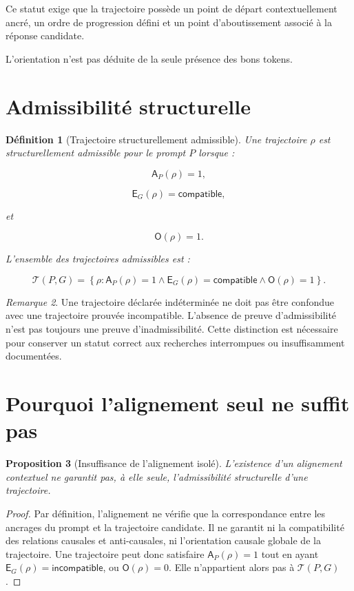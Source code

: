 \documentclass[11pt,a4paper,oneside]{book}
\newtheorem{definition}{Définition}[chapter]
\newtheorem{proposition}[definition]{Proposition}
\theoremstyle{remark}
\newtheorem{remarque}[definition]{Remarque}
\begin{document}
Ce statut exige que la trajectoire possède un point de départ
contextuellement ancré, un ordre de progression défini et un point
d'aboutissement associé à la réponse candidate.

L'orientation n'est pas déduite de la seule présence des bons tokens.

\section{Admissibilité structurelle}

\begin{definition}[Trajectoire structurellement admissible]
Une trajectoire \(\rho\) est structurellement admissible pour le
prompt \(P\) lorsque :

\[
\mathsf{A}_P(\rho)=1,
\]

\[
\mathsf{E}_G(\rho)=\mathsf{compatible},
\]

et

\[
\mathsf{O}(\rho)=1.
\]

L'ensemble des trajectoires admissibles est :

\[
\mathcal{T}(P,G)
=
\left\{
\rho:
\mathsf{A}_P(\rho)=1
\land
\mathsf{E}_G(\rho)=\mathsf{compatible}
\land
\mathsf{O}(\rho)=1
\right\}.
\]
\end{definition}

\begin{remarque}
Une trajectoire déclarée indéterminée ne doit pas être confondue
avec une trajectoire prouvée incompatible. L'absence de preuve
d'admissibilité n'est pas toujours une preuve d'inadmissibilité.
Cette distinction est nécessaire pour conserver un statut correct
aux recherches interrompues ou insuffisamment documentées.
\end{remarque}

\section{Pourquoi l'alignement seul ne suffit pas}

\begin{proposition}[Insuffisance de l'alignement isolé]
L'existence d'un alignement contextuel ne garantit pas, à elle seule,
l'admissibilité structurelle d'une trajectoire.

\end{proposition}

\begin{proof}
Par définition, l'alignement ne vérifie que la correspondance
entre les ancrages du prompt et la trajectoire candidate. Il ne
garantit ni la compatibilité des relations causales et anti-causales,
ni l'orientation causale globale de la trajectoire. Une trajectoire
peut donc satisfaire \(\mathsf{A}_P(\rho)=1\) tout en ayant
\(\mathsf{E}_G(\rho)=\mathsf{incompatible}\), ou
\(\mathsf{O}(\rho)=0\). Elle n'appartient alors pas à
\(\mathcal{T}(P,G)\).
\end{proof}
\end{document}

